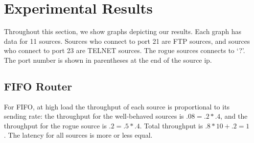 
\section{Experimental Results}

Throughout this section, we show graphs depicting our results.
Each graph has data for 11 sources.
Sources who connect to port 21 are FTP sources, and sources who connect to port 23 are TELNET sources.
The rogue sources connects to `?'.
The port number is shown in parentheses at the end of the source ip.

\newcommand{\makecaption}[2]{Thoughput and Latency for the #1 algorithm, with $M = #2$.
The first graph shows the average latency for each source. 
Red dots denote the $.9$ confidence intervals, and blue dots denote the mean.
The second graph shows the difference between the measured and the actual throughputs for each source, and
the third graph shows the measured throughput for each source.}

\newcommand{\makefigure}[3]{
\begin{figure}
\centering
\texttt{[image: img\_\#1\_\#2\#3\_latency.png]}
\texttt{[image: img\_\#1\_\#2\#3\_tput.png]} \\
\texttt{[image: img\_\#1\_\#2\#3\_tput\_nodelta.png]}
\label{fig:#1#2#3}
\caption{\makecaption{#1}{#2.#3}}
\end{figure}
}

\newcommand{\makeallfigures}[1]{

\makefigure{#1}{0}{4}

\makefigure{#1}{0}{6}

\makefigure{#1}{0}{8}

\makefigure{#1}{1}{0}

\makefigure{#1}{1}{2}

\makefigure{#1}{1}{4}

\makefigure{#1}{1}{6}

\makefigure{#1}{1}{8}

\makefigure{#1}{2}{0}
}

\newpage
\subsection{FIFO Router}

For FIFO, at high load the throughput of each source is proportional to its sending rate: 
the throughput for the well-behaved sources is $.08 = .2 * .4$, and the throughput for the rogue source is $.2 = .5 * .4$.
Total throughput is $.8 * 10 + .2 = 1$.
The latency for all sources is more or less equal.

